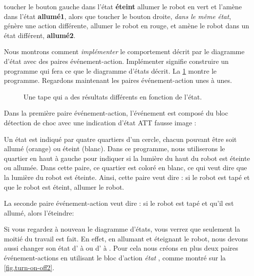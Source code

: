 toucher le bouton gauche dans l'état \textbf{éteint} allumer le robot en vert et l'amène dans l'état \textbf{allumé1}, alors que toucher le bouton droite, \emph{dans le même état}, génère une action différente, allumer le robot en rouge, et amène le robot dans un état différent, \textbf{allumé2}.


Nous montrons comment \emph{implémenter} le comportement décrit par le diagramme d'état avec des paires événement-action.
Implémenter signifie construire un programme qui fera ce que le diagramme d'états décrit.
La \cref{fig.turn-on-off} montre le programme.
Regardons maintenant les paires événement-action unes à unes.

\begin{figure}
	\hfill
	\caption{Une tape qui a des résultats différents en fonction de l'état.}
	\label{fig.turn-on-off}
\end{figure}

Dans la première paire événement-action, l'événement est composé du bloc détection de choc avec une indication d'état ATT fausse image : 

Un état est indiqué par quatre quartiers d'un cercle, chacun pouvant être soit allumé (orange) ou éteint (blanc).
Dans ce programme, nous utiliserons le quartier en haut à gauche pour indiquer si la lumière du haut du robot est éteinte ou allumée.
Dans cette paire, ce quartier est coloré en blanc, ce qui veut dire que la lumière du robot est éteinte.
Ainsi, cette paire veut dire : si le robot est tapé et que le robot est éteint, allumer le robot.

La seconde paire événement-action veut dire : si le robot est tapé et qu'il est allumé, alors l'éteindre: 

Si vous regardez à nouveau le diagramme d'états, vous verrez que seulement la moitié du travail est fait.
En effet, en allumant et éteignant le robot, nous devons aussi changer son état d' à  ou d' à .
Pour cela nous créons en plus deux paires événement-actions en utilisant le bloc d'action \emph{état} , comme montré sur la \cref{fig.turn-on-off2}.

